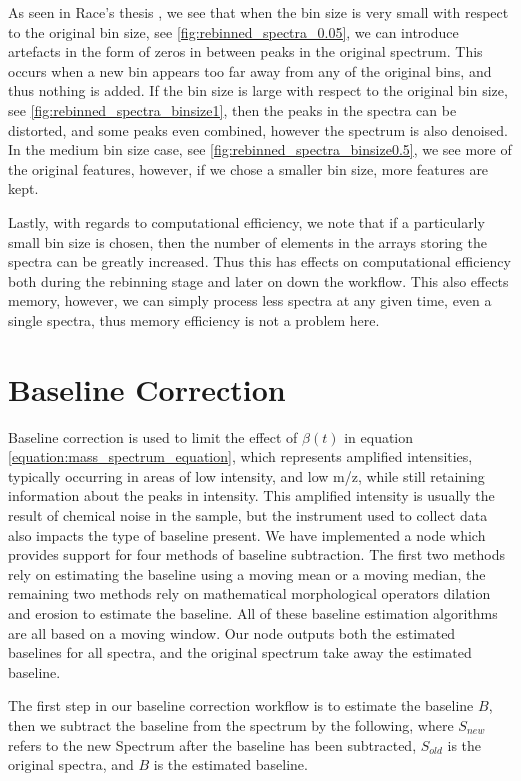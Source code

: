 \documentclass[11pt,openany]{book}
\begin{document}
As seen in Race's thesis \cite{alan_race_phd_thesis}, we see that when the bin size is very small with respect to the original bin size, see \ref{fig:rebinned_spectra_0.05}, we can introduce artefacts in the form of zeros in between peaks in the original spectrum. This occurs when a new bin appears too far away from any of the original bins, and thus nothing is added. If the bin size is large with respect to the original bin size, see \ref{fig:rebinned_spectra_binsize1}, then the peaks in the spectra can be distorted, and some peaks even combined, however the spectrum is also denoised. In the medium bin size case, see \ref{fig:rebinned_spectra_binsize0.5}, we see more of the original features, however, if we chose a smaller bin size, more features are kept.

Lastly, with regards to computational efficiency, we note that if a particularly small bin size is chosen, then the number of elements in the arrays storing the spectra can be greatly increased. Thus this has effects on computational efficiency both during the rebinning stage and later on down the workflow. This also effects memory, however, we can simply process less spectra at any given time, even a single spectra, thus memory efficiency is not a problem here. 

\section{Baseline Correction}
Baseline correction is used to limit the effect of $\beta(t)$ in equation \ref{equation:mass_spectrum_equation}, which represents amplified intensities, typically occurring in areas of low intensity, and low m/z, while still retaining information about the peaks in intensity. This amplified intensity is usually the result of chemical noise in the sample, but the instrument used to collect data also impacts the type of baseline present. We have implemented a node which provides support for four methods of baseline subtraction. The first two methods rely on estimating the baseline using a moving mean or a moving median, the remaining two methods rely on mathematical morphological operators dilation and erosion to estimate the baseline. All of these baseline estimation algorithms are all based on a moving window. Our node outputs both the estimated baselines for all spectra, and the original spectrum take away the estimated baseline. 

The first step in our baseline correction workflow is to estimate the baseline $B$, then we subtract the baseline from the spectrum by the following, where $S_{new}$ refers to the new Spectrum after the baseline has been subtracted, $S_{old}$ is the original spectra, and $B$ is the estimated baseline. 
\end{document}

